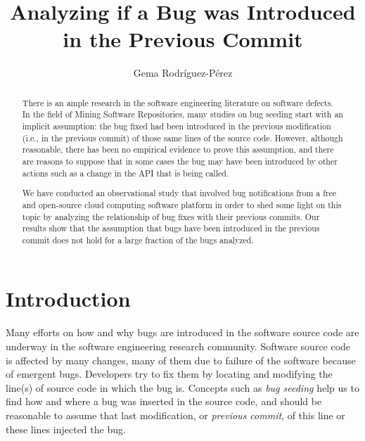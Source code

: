 \documentclass[ifip]{svmult}
\begin{document}
\title*{Analyzing if a Bug was Introduced in the Previous Commit}
\author{Gema Rodr\'iguez-P\'erez}
%
%
\maketitle

\begin{abstract}
There is an ample research in the software engineering literature on software defects. In the field of Mining Software Repositories, many studies on bug seeding start with an implicit assumption: the bug fixed had been introduced in the previous modification (i.e., in the previous commit) of those same lines of the source code. However, although reasonable, there has been no empirical evidence to prove this assumption, and there are reasons to suppose that in some cases the bug may have been introduced by other actions such as a change in the API that is being called.

We have conducted an observational study that involved bug notifications from a free and open-source cloud computing software platform in order to shed some light on this topic by analyzing the relationship of bug fixes with their previous commits. Our results show that the assumption that bugs have been introduced in the previous commit does not hold for a large fraction of the bugs analyzed.

\end{abstract}


\section{Introduction}
\label{sec:1}

Many efforts on how and why bugs are introduced in the software source code are underway in the software engineering research community. Software source code is affected by many changes, many of them due to failure of the software because of emergent bugs. Developers try to fix them by locating and modifying the line(s) of source code in which the bug is. Concepts such as \emph{bug seeding} help us to find how and where a bug was inserted in the source code, and should be reasonable to assume that last modification, or \textit{previous commit}, of this line or these lines injected the bug.
\end{document}
